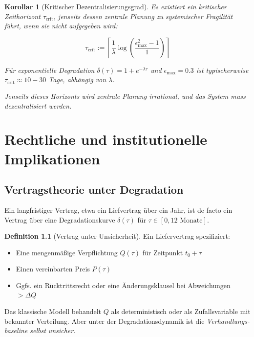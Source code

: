 \documentclass[12pt, a4paper, titlepage]{report}
\newtheorem{corollary}[theorem]{Korollar}
\theoremstyle{definition}
\newtheorem{definition}[theorem]{Definition}
\theoremstyle{remark}
\begin{document}
\begin{corollary}[Kritischer Dezentralisierungsgrad]
Es existiert ein kritischer Zeithorizont $\tau_{\text{crit}}$, jenseits dessen zentrale Planung zu systemischer Fragilität führt, wenn sie nicht aufgegeben wird:

\begin{equation}
\tau_{\text{crit}} := \left\lceil \frac{1}{\lambda} \log\left(\frac{\epsilon_{\max}^2 - 1}{1}\right) \right\rceil
\label{eq:critical_horizon}
\end{equation}

Für exponentielle Degradation $\delta(\tau) = 1 + e^{-\lambda\tau}$ und $\epsilon_{\max} = 0.3$ ist typischerweise $\tau_{\text{crit}} \approx 10-30$ Tage, abhängig von $\lambda$.

Jenseits dieses Horizonts wird zentrale Planung irrational, und das System muss dezentralisiert werden.
\end{corollary}

\chapter{Rechtliche und institutionelle Implikationen}
\label{sec:recht}

\section{Vertragstheorie unter Degradation}

Ein langfristiger Vertrag, etwa ein Liefvertrag über ein Jahr, ist de facto ein Vertrag über eine Degradationskurve $\delta(\tau)$ für $\tau \in [0, 12 \text{ Monate}]$.

\begin{definition}[Vertrag unter Unsicherheit]
Ein Liefervertrag spezifiziert:
\begin{itemize}
  \item Eine mengenmäßige Verpflichtung $Q(\tau)$ für Zeitpunkt $t_0 + \tau$
  \item Einen vereinbarten Preis $P(\tau)$
  \item Ggfs. ein Rücktrittsrecht oder eine Änderungsklausel bei Abweichungen $> \Delta Q$
\end{itemize}

Das klassische Modell behandelt $Q$ als deterministisch oder als Zufallsvariable mit bekannter Verteilung. Aber unter der Degradationsdynamik ist die \emph{Verhandlungs-baseline selbst unsicher}.
\end{definition}
\end{document}
